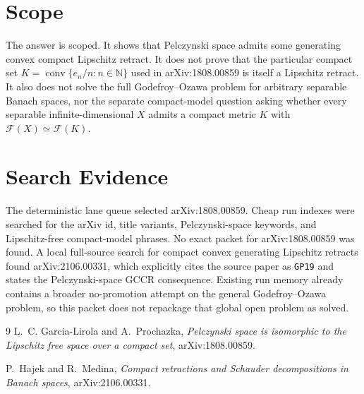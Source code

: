 \documentclass[11pt]{article}
\begin{document}
\section*{Scope}

The answer is scoped.  It shows that Pelczynski space admits some generating
convex compact Lipschitz retract.  It does not prove that the particular
compact set \(K=\overline{\operatorname{conv}}\{e_n/n:n\in\mathbb N\}\) used
in arXiv:1808.00859 is itself a Lipschitz retract.  It also does not solve the
full Godefroy--Ozawa problem for arbitrary separable Banach spaces, nor the
separate compact-model question asking whether every separable
infinite-dimensional \(X\) admits a compact metric \(K\) with
\(\mathcal F(X)\simeq \mathcal F(K)\).

\section*{Search Evidence}

The deterministic lane queue selected arXiv:1808.00859.  Cheap run indexes
were searched for the arXiv id, title variants, Pelczynski-space keywords, and
Lipschitz-free compact-model phrases.  No exact packet for arXiv:1808.00859
was found.  A local full-source search for compact convex generating
Lipschitz retracts found arXiv:2106.00331, which explicitly cites the source
paper as \texttt{GP19} and states the Pelczynski-space GCCR consequence.
Existing run memory already contains a broader no-promotion attempt on the
general Godefroy--Ozawa problem, so this packet does not repackage that global
open problem as solved.

\begin{thebibliography}{9}
L.~C. Garcia-Lirola and A.~Prochazka,
\emph{Pelczynski space is isomorphic to the Lipschitz free space over a
compact set}, arXiv:1808.00859.

P.~Hajek and R.~Medina,
\emph{Compact retractions and Schauder decompositions in Banach spaces},
arXiv:2106.00331.
\end{thebibliography}
\end{document}
